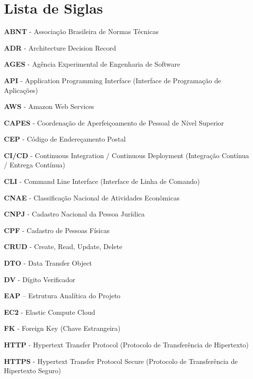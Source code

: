 \chapter*{Lista de Siglas}
\noindent \textbf{ABNT} - Associação Brasileira de Normas Técnicas\par
\noindent \textbf{ADR} - Architecture Decision Record\par
\noindent \textbf{AGES} - Agência Experimental de Engenharia de Software\par
\noindent \textbf{API} - Application Programming Interface (Interface de Programação de Aplicações)\par
\noindent \textbf{AWS} - Amazon Web Services\par
\noindent \textbf{CAPES} - Coordenação de Aperfeiçoamento de Pessoal de Nível Superior\par
\noindent \textbf{CEP} - Código de Endereçamento Postal\par
\noindent \textbf{CI/CD} - Continuous Integration / Continuous Deployment (Integração Contínua / Entrega Contínua)\par
\noindent \textbf{CLI} - Command Line Interface (Interface de Linha de Comando)\par
\noindent \textbf{CNAE} - Classificação Nacional de Atividades Econômicas\par
\noindent \textbf{CNPJ} - Cadastro Nacional da Pessoa Jurídica\par
\noindent \textbf{CPF} - Cadastro de Pessoas Físicas\par
\noindent \textbf{CRUD} - Create, Read, Update, Delete\par
\noindent \textbf{DTO} - Data Transfer Object\par
\noindent \textbf{DV} - Dígito Verificador\par
\noindent \textbf{EAP} – Estrutura Analítica do Projeto\par
\noindent \textbf{EC2} - Elastic Compute Cloud\par
\noindent \textbf{FK} - Foreign Key (Chave Estrangeira)\par
\noindent \textbf{HTTP} - Hypertext Transfer Protocol (Protocolo de Transferência de Hipertexto)\par
\noindent \textbf{HTTPS} - Hypertext Transfer Protocol Secure (Protocolo de Transferência de Hipertexto Seguro)\par
